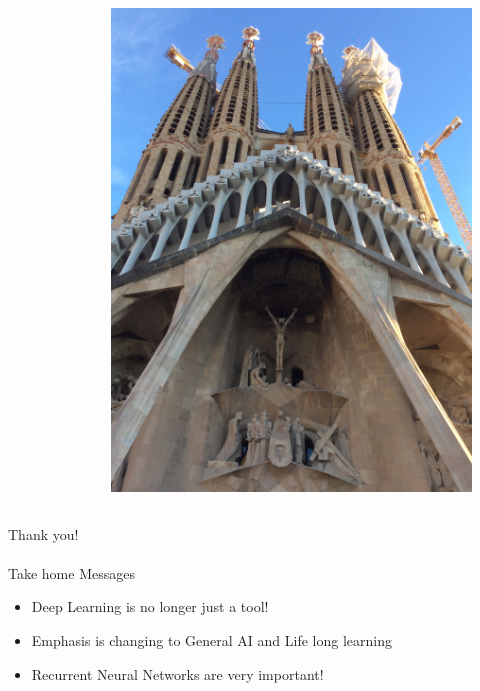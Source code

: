 \documentclass[11pt,
               hyperref={colorlinks,citecolor=pink,linkcolor=red,urlcolor=blue}
               ]{beamer}
\begin{document}
\begin{frame}
\begin{columns}
\begin{column}{0.25\textwidth}
\begin{figure}
        \end{figure}
      \end{column}
      \begin{column}{0.25\textwidth}
        \begin{figure}
          \centering
          \includegraphics[width=\textwidth]{barc2.jpeg}
        \end{figure}
      \end{column}
    \end{columns}
  \end{frame}

  \begin{frame}[noframenumbering]

    \begin{center}
      \Huge{Thank you!}\\~\\
      \huge{Take home Messages}
      \normalsize
      \begin{itemize}
        \item Deep Learning is no longer just a tool!
        \item Emphasis is changing to General AI and Life long learning
        \item Recurrent Neural Networks are very important!
      \end{itemize}
    \end{center}
  \end{frame}
\end{document}
